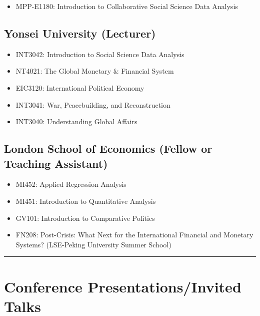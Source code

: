 \documentclass[a4paper]{article}
\begin{document}
{\begin{itemize}

    \item MPP-E1180: Introduction to Collaborative Social Science Data Analysis

\end{itemize}

\subsection*{Yonsei University (Lecturer)}

\begin{itemize}

    \item INT3042: Introduction to Social Science Data Analysis
    \item NT4021: The Global Monetary \& Financial System
    \item EIC3120: International Political Economy
    \item INT3041: War, Peacebuilding, and Reconstruction
    \item INT3040: Understanding Global Affairs

\end{itemize}

\subsection*{London School of Economics (Fellow or Teaching Assistant)}

\begin{itemize}
    \item MI452: Applied Regression Analysis
    \item MI451: Introduction to Quantitative Analysis
    \item GV101: Introduction to Comparative Politics
    \item FN208: Post-Crisis: What Next for the International Financial and Monetary Systems? (LSE-Peking University Summer School)
\end{itemize}

\vspace{0.25cm}
\medskip\hrule height 1pt
\vspace{0.5cm}

\section*{Conference Presentations/Invited Talks}

}
\end{document}

